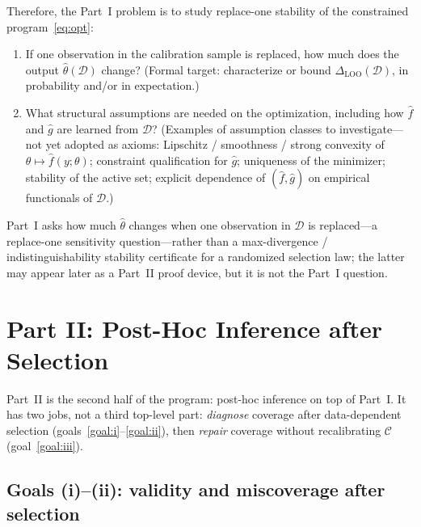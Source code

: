 \documentclass[12pt]{article}
\theoremstyle{plain}
\begin{document}
\label{prob:part-i}
Therefore, the Part~I problem is to study replace-one stability of the constrained program~\eqref{eq:opt}:
\begin{enumerate}[leftmargin=*]
  \item\label{prob:part-i-1}
        If one observation in the calibration sample is replaced, how much does the output $\hat\theta(\mathcal{D})$ change?
        (Formal target: characterize or bound $\Delta_{\mathrm{LOO}}(\mathcal{D})$, in probability and/or in expectation.)
  \item\label{prob:part-i-2}
        What structural assumptions are needed on the optimization, including how $\hat f$ and $\hat g$ are learned from $\mathcal{D}$?
        (Examples of assumption classes to investigate---not yet adopted as axioms:
        Lipschitz / smoothness / strong convexity of $\theta\mapsto\hat f(y;\theta)$;
        constraint qualification for $\hat g$;
        uniqueness of the minimizer;
        stability of the active set;
        explicit dependence of $(\hat f,\hat g)$ on empirical functionals of $\mathcal{D}$.)
\end{enumerate}
\label{rem:LOO-vs-ZJ}
Part~I asks how much $\hat\theta$ changes when one observation in $\mathcal{D}$ is replaced---a replace-one sensitivity question---rather than a max-divergence / indistinguishability stability certificate for a randomized selection law; the latter may appear later as a Part~II proof device, but it is not the Part~I question.

\section{Part II: Post-Hoc Inference after Selection}
\label{sec:part-ii}

Part~II is the second half of the program: post-hoc inference on top of Part~I.
It has two jobs, not a third top-level part: \emph{diagnose} coverage after data-dependent selection (goals~\ref{goal:i}--\ref{goal:ii}), then \emph{repair} coverage without recalibrating $\mathcal{C}$ (goal~\ref{goal:iii}).

\subsection{Goals (i)--(ii): validity and miscoverage after selection}
\label{sec:part-ii-ab}
\end{document}
